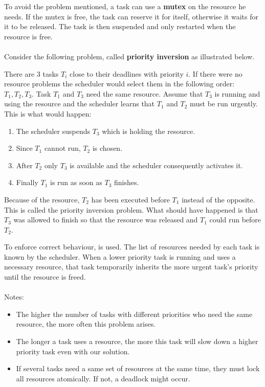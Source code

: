 \documentclass[../main.tex]{subfiles}
\begin{document}
To avoid the problem mentioned, a task can use a \textbf{mutex} on the resource he needs. If the mutex is free, the task can reserve it for itself, otherwise it waits for it to be released. The task is then suspended and only restarted when the resource is free.
\\\\
Consider the following problem, called \textbf{priority inversion} as illustrated below.
\begin{exmp}
There are 3 tasks $T_i$ close to their deadlines with priority $i$. If there were no resource problems the scheduler would select them in the following order: $T_1, T_2, T_3$. Task $T_1$ and $T_3$ need the same resource. Assume that $T_3$ is running and using the resource and the scheduler learns that $T_1$ and $T_2$ must be run urgently. This is what would happen:
\begin{enumerate}
	\item The scheduler suspends $T_3$ which is holding the resource.
	\item Since $T_1$ cannot run, $T_2$ is chosen.
	\item After $T_2$ only $T_3$ is available and the scheduler consequently activates it.
	\item Finally $T_1$ is run as soon as $T_3$ finishes.
\end{enumerate}
Because of the resource, $T_2$ has been executed before $T_1$ instead of the opposite. This is called the priority inversion problem. What should have happened is that $T_3$ was allowed to finish so that the resource was released and $T_1$ could run before $T_2$.
\end{exmp}
To enforce correct behaviour,  is used. The list of resources needed by each task is known by the scheduler. When a lower priority task is running and uses a necessary resource, that task temporarily inherits the more urgent task's priority until the resource is freed.
\\\\
Notes:
\begin{itemize}
	\item The higher the number of tasks with different priorities who need the same resource, the more often this problem arises.
	\item The longer a task uses a resource, the more this task will slow down a higher priority task even with our solution.
	\item If several tasks need a same set of resources at the same time, they must lock all resources atomically. If not, a deadlock might occur.
\end{itemize}
\end{document}
